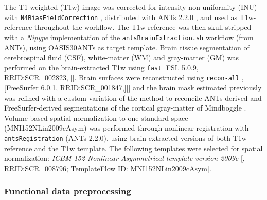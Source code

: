 \documentclass[10pt,letterpaper]{article}
\begin{document}
The T1-weighted (T1w) image was corrected for intensity non-uniformity
(INU) with \texttt{N4BiasFieldCorrection} \cite{n4}, distributed with
ANTs 2.2.0 \cite[RRID:SCR\_004757]{ants}, and used as T1w-reference
throughout the workflow.
The T1w-reference was then skull-stripped with a \emph{Nipype} implementation
of the \texttt{antsBrainExtraction.sh} workflow (from ANTs), using OASIS30ANTs
as target template.
Brain tissue segmentation of cerebrospinal fluid (CSF), white-matter (WM) and
gray-matter (GM) was performed on the brain-extracted T1w using
\texttt{fast} \cite{fsl_fast} [FSL 5.0.9, RRID:SCR\_002823,][].
Brain surfaces were reconstructed using \texttt{recon-all} \cite{fs_reconall},
[FreeSurfer 6.0.1, RRID:SCR\_001847,][] and the brain mask estimated
previously was refined with a custom variation of the method to
reconcile ANTs-derived and FreeSurfer-derived segmentations of the
cortical gray-matter of Mindboggle \cite[RRID:SCR\_002438,]{mindboggle}.
Volume-based spatial normalization to one standard space (MNI152NLin2009cAsym)
was performed through nonlinear registration with \texttt{antsRegistration}
(ANTs 2.2.0), using brain-extracted versions of both T1w reference and the T1w template.
The following templates were selected for spatial normalization: \emph{ICBM 152 Nonlinear
Asymmetrical template version 2009c} {[}\cite{mni152nlin2009casym},
RRID:SCR\_008796; TemplateFlow ID: MNI152NLin2009cAsym{]}.

\subsubsection*{Functional data preprocessing}
\label{methods:func}
\end{document}
